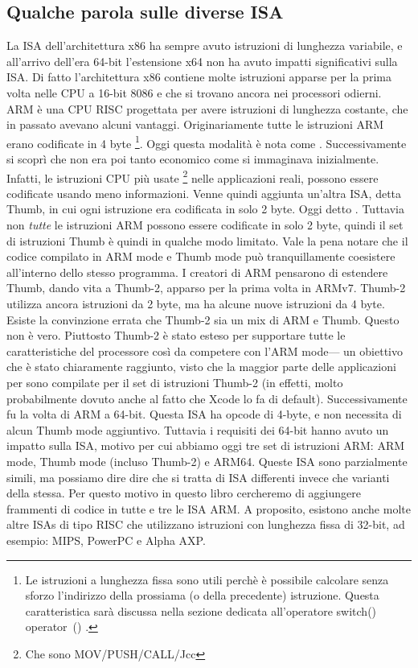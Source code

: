 %
%
%

\subsection{Qualche parola sulle diverse \ac{ISA}}
La \ac{ISA} dell'architettura x86 ha sempre avuto istruzioni di lunghezza variabile, e all'arrivo dell'era 64-bit l'estensione x64 non ha avuto impatti significativi sulla \ac{ISA}. Di fatto l'architettura x86 contiene molte istruzioni apparse per la prima volta nelle CPU a 16-bit 8086 e che si trovano ancora nei processori odierni.
ARM è una \ac{CPU} \ac{RISC} progettata per avere istruzioni di lunghezza costante, che in passato avevano alcuni vantaggi.
Originariamente tutte le istruzioni ARM erano codificate in 4 byte%
\footnote{
Le istruzioni a lunghezza fissa sono utili perchè è possibile calcolare senza sforzo l'indirizzo della prossiama (o della precedente) istruzione.
Questa caratteristica sarà discussa nella sezione dedicata all'operatore switch() operator~() .
}.
Oggi questa modalità è nota come .
Successivamente si scoprì che non era poi tanto economico come si immaginava inizialmente.
Infatti, le istruzioni \ac{CPU} più usate \footnote{Che sono MOV/PUSH/CALL/Jcc} nelle applicazioni reali, possono essere codificate usando meno informazioni.
Venne quindi aggiunta un'altra \ac{ISA}, detta Thumb, in cui ogni istruzione era codificata in solo 2 byte.
Oggi detto .
Tuttavia non \emph{tutte} le istruzioni ARM possono essere codificate in solo 2 byte, quindi il set di istruzioni Thumb è quindi in qualche modo limitato.
Vale la pena notare che il codice compilato in ARM mode e Thumb mode può tranquillamente coesistere all'interno dello stesso programma.
I creatori di ARM pensarono di estendere Thumb, dando vita a Thumb-2, apparso per la prima volta in ARMv7.
Thumb-2 utilizza ancora istruzioni da 2 byte, ma ha alcune nuove istruzioni da 4 byte.
Esiste la convinzione errata che Thumb-2 sia un mix di ARM e Thumb. Questo non è vero.
Piuttosto Thumb-2 è stato esteso per supportare tutte le caratteristiche del processore così da competere con l'ARM mode--- un obiettivo che è stato chiaramente raggiunto, visto che la maggior parte delle applicazioni per \idevices sono compilate per il set di istruzioni Thumb-2 (in effetti, molto probabilmente dovuto anche al fatto che Xcode lo fa di default).
Successivamente fu la volta di ARM a 64-bit. Questa \ac{ISA} ha opcode di 4-byte, e non necessita di alcun Thumb mode aggiuntivo.
Tuttavia i requisiti dei 64-bit hanno avuto un impatto sulla \ac{ISA}, motivo per cui abbiamo oggi tre set di istruzioni ARM: ARM mode, Thumb mode (incluso Thumb-2) e ARM64.
Queste \ac{ISA} sono parzialmente simili, ma possiamo dire dire che si tratta di \ac{ISA} differenti invece che varianti della stessa.
Per questo motivo in questo libro cercheremo di aggiungere frammenti di codice in tutte e tre le \ac{ISA} ARM.
%
%
%
A proposito, esistono anche molte altre \ac{ISA}s di tipo \ac{RISC} che utilizzano istruzioni con lunghezza fissa di 32-bit, ad esempio: MIPS, PowerPC e Alpha AXP.
